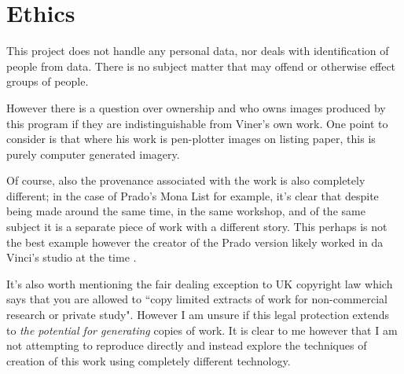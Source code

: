 \chapter{Ethics}
This project does not handle any personal data, nor deals with identification of
people from data. There is no subject matter that may offend or otherwise effect
groups of people. 

However there is a question over ownership and who owns images produced by this
program if they are indistinguishable from Viner's own work.  One point to
consider is that where his work is pen-plotter images on listing paper, this is
purely computer generated imagery. 

Of course, also the provenance associated with the work is also completely
different; in the case of Prado's Mona List for example, it's clear that despite
being made around the same time, in the same workshop, and of the same subject
it is a separate piece of work with a different story. This perhaps is not the
best example however the creator of the Prado version likely worked in da
Vinci's studio at the time \citep{museodelprado_MonaLisa}. 

It's also worth mentioning the fair dealing exception to UK copyright law which
says that you are allowed to ``copy limited extracts of work for non-commercial
research or private study"\citep{govuk_copyright}. However I am unsure if this
legal protection extends to \emph{the potential for generating} copies of work.
It is clear to me however that I am not attempting to reproduce directly and
instead explore the techniques of creation of this work using completely
different technology.
